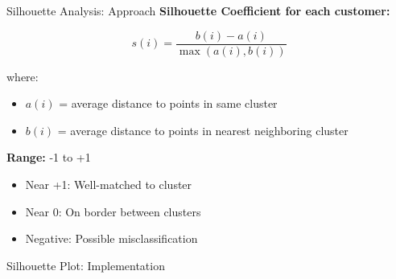 \documentclass[aspectratio=169,ignorenonframetext]{beamer}
\begin{document}
\begin{frame}{Silhouette Analysis: Approach}
\textbf{Silhouette Coefficient for each customer:}

\[s(i) = \frac{b(i) - a(i)}{\max(a(i),b(i))}\]

where:

\begin{itemize}
\item
  \(a(i)\) = average distance to points in same cluster
\item
  \(b(i)\) = average distance to points in nearest neighboring cluster
\end{itemize}

\textbf{Range:} -1 to +1

\begin{itemize}
\item
  Near +1: Well-matched to cluster
\item
  Near 0: On border between clusters
\item
  Negative: Possible misclassification
\end{itemize}
\end{frame}

\begin{frame}[fragile]{Silhouette Plot: Implementation}
\begin{Shaded}
\begin{Highlighting}[]

\OperatorTok{=}
\NormalTok{)}

 
\OperatorTok{=}\NormalTok{ silhouette\_vals[kmeans\_labels }\OperatorTok{==}\NormalTok{ i]}

\end{Highlighting}
\end{Shaded}
\end{frame}
\end{document}

